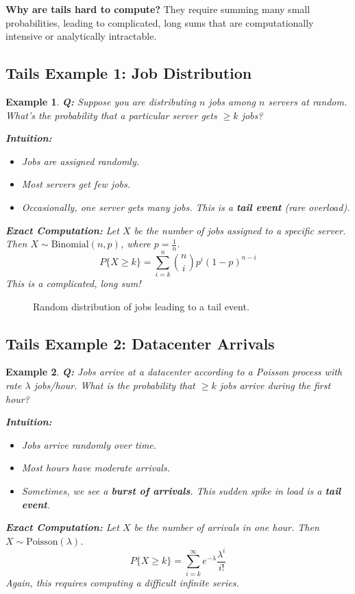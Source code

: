 \documentclass{article}
\newtheorem{example}{Example}
\begin{document}
\textbf{Why are tails hard to compute?}
They require summing many small probabilities, leading to complicated, long sums that are computationally intensive or analytically intractable.

\subsection{Tails Example 1: Job Distribution}
\begin{example}
\textbf{Q:} Suppose you are distributing $n$ jobs among $n$ servers at random. What's the probability that a particular server gets $\ge k$ jobs?

\textbf{Intuition:}
\begin{itemize}
    \item Jobs are assigned randomly.
    \item Most servers get few jobs.
    \item Occasionally, one server gets many jobs. This is a \textbf{tail event} (rare overload).
\end{itemize}

\textbf{Exact Computation:}
Let $X$ be the number of jobs assigned to a specific server. Then $X \sim \text{Binomial}(n, p)$, where $p = \frac{1}{n}$.
\[ P\{X \ge k\} = \sum_{i=k}^{n} \binom{n}{i} p^i (1-p)^{n-i} \]
This is a complicated, long sum!
\end{example}

\begin{figure}[h]
    \centering
    \caption{Random distribution of jobs leading to a tail event.}
\end{figure}

\subsection{Tails Example 2: Datacenter Arrivals}
\begin{example}
\textbf{Q:} Jobs arrive at a datacenter according to a Poisson process with rate $\lambda$ jobs/hour. What is the probability that $\ge k$ jobs arrive during the first hour?

\textbf{Intuition:}
\begin{itemize}
    \item Jobs arrive randomly over time.
    \item Most hours have \textit{moderate} arrivals.
    \item Sometimes, we see a \textbf{burst of arrivals}. This sudden spike in load is a \textbf{tail event}.
\end{itemize}

\textbf{Exact Computation:}
Let $X$ be the number of arrivals in one hour. Then $X \sim \text{Poisson}(\lambda)$.
\[ P\{X \ge k\} = \sum_{i=k}^{\infty} e^{-\lambda} \frac{\lambda^i}{i!} \]
Again, this requires computing a difficult infinite series.
\end{example}
\end{document}
